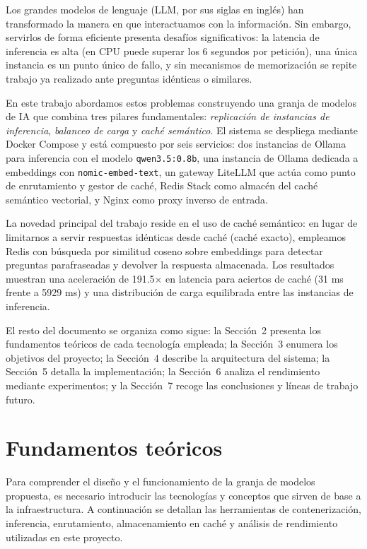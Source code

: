 Los grandes modelos de lenguaje (LLM, por sus siglas en inglés) han transformado la manera en que interactuamos con la información. Sin embargo, servirlos de forma eficiente presenta desafíos significativos: la latencia de inferencia es alta (en CPU puede superar los 6 segundos por petición), una única instancia es un punto único de fallo, y sin mecanismos de memorización se repite trabajo ya realizado ante preguntas idénticas o similares.

En este trabajo abordamos estos problemas construyendo una granja de modelos de IA que combina tres pilares fundamentales: \textit{replicación de instancias de inferencia}, \textit{balanceo de carga} y \textit{caché semántico}. El sistema se despliega mediante Docker Compose y está compuesto por seis servicios: dos instancias de Ollama para inferencia con el modelo \texttt{qwen3.5:0.8b}, una instancia de Ollama dedicada a embeddings con \texttt{nomic-embed-text}, un gateway LiteLLM que actúa como punto de enrutamiento y gestor de caché, Redis Stack como almacén del caché semántico vectorial, y Nginx como proxy inverso de entrada.

La novedad principal del trabajo reside en el uso de caché semántico: en lugar de limitarnos a servir respuestas idénticas desde caché (caché exacto), empleamos Redis con búsqueda por similitud coseno sobre embeddings para detectar preguntas parafraseadas y devolver la respuesta almacenada. Los resultados muestran una aceleración de 191.5$\times$ en latencia para aciertos de caché (31 ms frente a 5929 ms) y una distribución de carga equilibrada entre las instancias de inferencia.

El resto del documento se organiza como sigue: la Sección~2 presenta los fundamentos teóricos de cada tecnología empleada; la Sección~3 enumera los objetivos del proyecto; la Sección~4 describe la arquitectura del sistema; la Sección~5 detalla la implementación; la Sección~6 analiza el rendimiento mediante experimentos; y la Sección~7 recoge las conclusiones y líneas de trabajo futuro.

\section{Fundamentos teóricos}

Para comprender el diseño y el funcionamiento de la granja de modelos propuesta, es necesario introducir las tecnologías y conceptos que sirven de base a la infraestructura. A continuación se detallan las herramientas de contenerización, inferencia, enrutamiento, almacenamiento en caché y análisis de rendimiento utilizadas en este proyecto.

